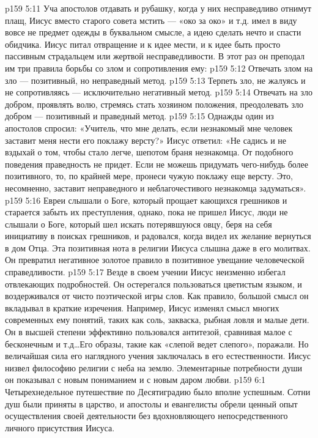 \vs p159 5:11 Уча апостолов отдавать и рубашку, когда у них несправедливо отнимут плащ, Иисус вместо старого совета мстить --- «око за око» и т.д. имел в виду вовсе не предмет одежды в буквальном смысле, а идею сделать нечто  и спасти обидчика. Иисус питал отвращение и к идее мести, и к идее быть просто пассивным страдальцем или жертвой несправедливости. В этот раз он преподал им три правила борьбы со злом и сопротивления ему:
\vs p159 5:12 \bibnobreakspace Отвечать злом на зло --- позитивный, но неправедный метод.
\vs p159 5:13 \bibnobreakspace Терпеть зло, не жалуясь и не сопротивляясь --- исключительно негативный метод.
\vs p159 5:14 \bibnobreakspace Отвечать на зло добром, проявлять волю, стремясь стать хозяином положения, преодолевать зло добром --- позитивный и праведный метод.
\vs p159 5:15 \pc Однажды один из апостолов спросил: «Учитель, что мне делать, если незнакомый мне человек заставит меня нести его поклажу версту?» Иисус ответил: «Не садись и не вздыхай о том, чтобы стало легче, шепотом браня незнакомца. От подобного поведения праведность не придет. Если не можешь придумать чего\hyp{}нибудь более позитивного, то, по крайней мере, пронеси чужую поклажу еще версту. Это, несомненно, заставит неправедного и неблагочестивого незнакомца задуматься».
\vs p159 5:16 Евреи слышали о Боге, который прощает кающихся грешников и старается забыть их преступления, однако, пока не пришел Иисус, люди не слышали о Боге, который шел искать потерявшуюся овцу, беря на себя инициативу в поисках грешников, и радовался, когда видел их желание вернуться в дом Отца. Эта позитивная нота в религии Иисуса слышна даже в его молитвах. Он превратил негативное золотое правило в позитивное увещание человеческой справедливости.
\vs p159 5:17 Везде в своем учении Иисус неизменно избегал отвлекающих подробностей. Он остерегался пользоваться цветистым языком, и воздерживался от чисто поэтической игры слов. Как правило, большой смысл он вкладывал в краткие изречения. Например, Иисус изменял смысл многих современных ему понятий, таких как соль, закваска, рыбная ловля и малые дети. Он в высшей степени эффективно пользовался антитезой, сравнивая малое с бесконечным и т.д\ldots Его образы, такие как «слепой ведет слепого», поражали. Но величайшая сила его наглядного учения заключалась в его естественности. Иисус низвел философию религии с неба на землю. Элементарные потребности души он показывал с новым пониманием и с новым даром любви.
\vs p159 6:1 Четырехнедельное путешествие по Десятиградию было вполне успешным. Сотни душ были приняты в царство, и апостолы и евангелисты обрели ценный опыт осуществления своей деятельности без вдохновляющего непосредственного личного присутствия Иисуса.
